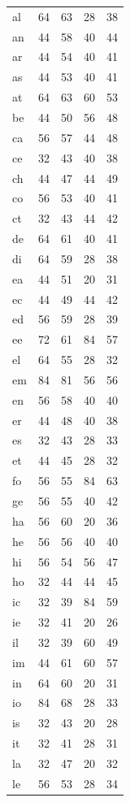 \documentclass[ms,electronic,twosidetoc,letterpaper,chaptercenter,parttop,lof,lot]{byumsphd}
\begin{document}
\begin{longtable}{| l | c c | c c |}
  al & 64 & 63 & 28 & 38 \\
  an & 44 & 58 & 40 & 44 \\
  ar & 44 & 54 & 40 & 41 \\
  as & 44 & 53 & 40 & 41 \\
  at & 64 & 63 & 60 & 53 \\
  be & 44 & 50 & 56 & 48 \\
  ca & 56 & 57 & 44 & 48 \\
  ce & 32 & 43 & 40 & 38 \\
  ch & 44 & 47 & 44 & 49 \\
  co & 56 & 53 & 40 & 41 \\
  ct & 32 & 43 & 44 & 42 \\
  de & 64 & 61 & 40 & 41 \\
  di & 64 & 59 & 28 & 38 \\
  ea & 44 & 51 & 20 & 31 \\
  ec & 44 & 49 & 44 & 42 \\
  ed & 56 & 59 & 28 & 39 \\
  ee & 72 & 61 & 84 & 57 \\
  el & 64 & 55 & 28 & 32 \\
  em & 84 & 81 & 56 & 56 \\
  en & 56 & 58 & 40 & 40 \\
  er & 44 & 48 & 40 & 38 \\
  es & 32 & 43 & 28 & 33 \\
  et & 44 & 45 & 28 & 32 \\
  fo & 56 & 55 & 84 & 63 \\
  ge & 56 & 55 & 40 & 42 \\
  ha & 56 & 60 & 20 & 36 \\
  he & 56 & 56 & 40 & 40 \\
  hi & 56 & 54 & 56 & 47 \\
  ho & 32 & 44 & 44 & 45 \\
  ic & 32 & 39 & 84 & 59 \\
  ie & 32 & 41 & 20 & 26 \\
  il & 32 & 39 & 60 & 49 \\
  im & 44 & 61 & 60 & 57 \\
  in & 64 & 60 & 20 & 31 \\
  io & 84 & 68 & 28 & 33 \\
  is & 32 & 43 & 20 & 28 \\
  it & 32 & 41 & 28 & 31 \\
  la & 32 & 47 & 20 & 32 \\
  le & 56 & 53 & 28 & 34 \\

\end{longtable}
\end{document}
